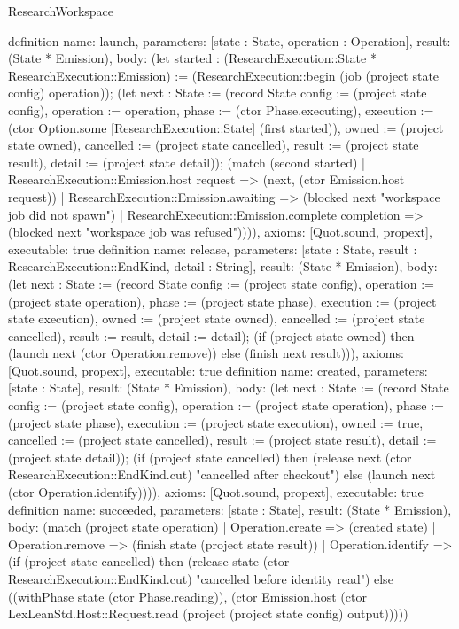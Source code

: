 \begin{lexlean}{ResearchWorkspace}
\begin{semanticmodule}
definition{
 name: launch,
 parameters: [state : State, operation : Operation],
 result: (State * Emission),
 body: (let started : (ResearchExecution::State * ResearchExecution::Emission) := (ResearchExecution::begin (job (project state config) operation)); (let next : State := (record State {config := (project state config), operation := operation, phase := (ctor Phase.executing), execution := (ctor Option.some [ResearchExecution::State] (first started)), owned := (project state owned), cancelled := (project state cancelled), result := (project state result), detail := (project state detail)}); (match (second started) | ResearchExecution::Emission.host request => (next, (ctor Emission.host request)) | ResearchExecution::Emission.awaiting => (blocked next "workspace job did not spawn") | ResearchExecution::Emission.complete completion => (blocked next "workspace job was refused")))),
 axioms: [Quot.sound, propext],
 executable: true
}
definition{
 name: release,
 parameters: [state : State, result : ResearchExecution::EndKind, detail : String],
 result: (State * Emission),
 body: (let next : State := (record State {config := (project state config), operation := (project state operation), phase := (project state phase), execution := (project state execution), owned := (project state owned), cancelled := (project state cancelled), result := result, detail := detail}); (if (project state owned) then (launch next (ctor Operation.remove)) else (finish next result))),
 axioms: [Quot.sound, propext],
 executable: true
}
definition{
 name: created,
 parameters: [state : State],
 result: (State * Emission),
 body: (let next : State := (record State {config := (project state config), operation := (project state operation), phase := (project state phase), execution := (project state execution), owned := true, cancelled := (project state cancelled), result := (project state result), detail := (project state detail)}); (if (project state cancelled) then (release next (ctor ResearchExecution::EndKind.cut) "cancelled after checkout") else (launch next (ctor Operation.identify)))),
 axioms: [Quot.sound, propext],
 executable: true
}
definition{
 name: succeeded,
 parameters: [state : State],
 result: (State * Emission),
 body: (match (project state operation)
 | Operation.create => (created state)
 | Operation.remove => (finish state (project state result))
 | Operation.identify => (if (project state cancelled) then (release state (ctor ResearchExecution::EndKind.cut) "cancelled before identity read") else ((withPhase state (ctor Phase.reading)), (ctor Emission.host (ctor LexLeanStd.Host::Request.read (project (project state config) output)))))
}
\end{semanticmodule}
\end{lexlean}
